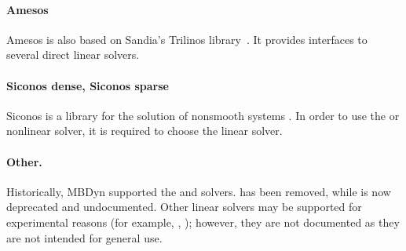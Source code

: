 \paragraph{Amesos}
Amesos is also based on Sandia's Trilinos library~\cite{TRILINOS-WEBSITE}.
It provides interfaces to several direct linear solvers.

\paragraph{Siconos dense, Siconos sparse}
Siconos is a library for the solution of nonsmooth systems \cite{SICONOS-WEBSITE}.
In order to use the  or  nonlinear solver,
it is required to choose the  linear solver.

\begin{comment}
Another linear solver, that is available mostly for historical reasons, 
is \kw{harwell}, with a \nt{workspace\_size}
of $ \nt{numdofs}\times\nt{numdofs} $, but in certain cases the user
might prefer a smaller workspace, since the matrix is handled as sparse,
while sometimes a larger space is required, since when the matrix is
full, a little more space is required, due to extra storage needs when
the matrix fills up.
\end{comment}

\paragraph{Other.}
Historically, MBDyn supported the  and  solvers.
 has been removed, while 
is now deprecated and undocumented.
Other linear solvers may be supported for experimental reasons
(for example, , );
however, they are not documented as they are not intended for general use.

